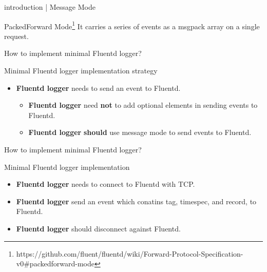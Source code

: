 \documentclass[12pt, unicode]{beamer}
\begin{document}
\begin{frame}{introduction | Message Mode}
\begin{block}{PackedForward Mode\footnote[frame]{https://github.com/fluent/fluentd/wiki/Forward-Protocol-Specification-v0\#packedforward-mode}}
It carries a series of events as a msgpack array on a single request.
\end{block}
\begin{table}[htb]
\end{table}
\end{frame}

\begin{frame}{How to implement minimal Fluentd logger?}
\begin{block}{Minimal Fluentd logger implementation strategy}
\begin{itemize}
\item {} {{\textbf {Fluentd logger}} needs to send an event to Fluentd.}
  \begin{itemize}
  \item {} {{\textbf {Fluentd logger}} need {\textbf {not}} to add optional elements in sending events to Fluentd.}
  \item {} {{\textbf {Fluentd logger}} {\textbf {should}} use message mode to send events to Fluentd.}
  \end{itemize}
\end{itemize}
\end{block}
\end{frame}

\begin{frame}{How to implement minimal Fluentd logger?}
\begin{block}{Minimal Fluentd logger implementation}
\begin{itemize}
\item {} {{\textbf {Fluentd logger}} needs to connect to Fluentd with TCP.}
\item {} {{\textbf {Fluentd logger}} send an event which conatins tag, timespec, and record, to Fluentd.}
\item {} {{\textbf {Fluentd logger}} should disconnect against  Fluentd.}
\end{itemize}
\end{block}
\end{frame}
\end{document}
